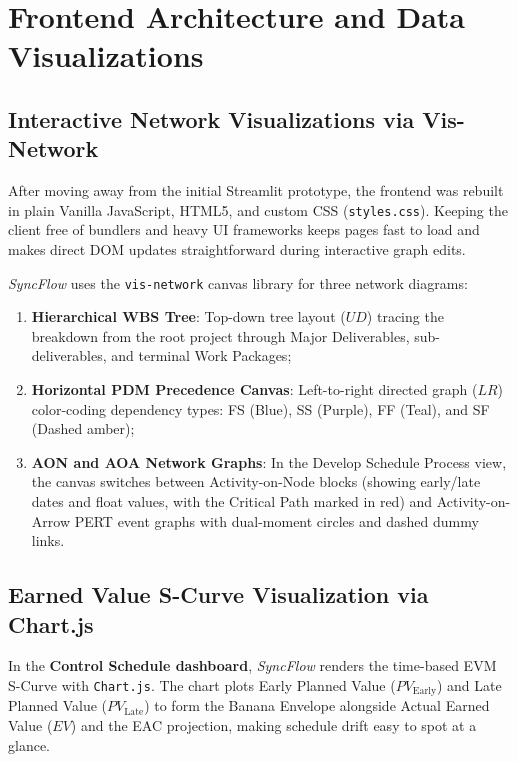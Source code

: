 \newpage

\section{Frontend Architecture and Data Visualizations}
\subsection{Interactive Network Visualizations via Vis-Network}
After moving away from the initial Streamlit prototype, the frontend was rebuilt in plain Vanilla JavaScript, HTML5, and custom CSS (\texttt{styles.css}). Keeping the client free of bundlers and heavy UI frameworks keeps pages fast to load and makes direct DOM updates straightforward during interactive graph edits.

\vspace{2mm}

\noindent \textit{SyncFlow} uses the \texttt{vis-network} canvas library for three network diagrams:
\begin{enumerate}[leftmargin=*,itemsep=1pt,topsep=1pt]
    \item \textbf{Hierarchical WBS Tree}: Top-down tree layout ($UD$) tracing the breakdown from the root project through Major Deliverables, sub-deliverables, and terminal Work Packages;
    
    \vspace{1mm}
    
    \item \textbf{Horizontal PDM Precedence Canvas}: Left-to-right directed graph ($LR$) color-coding dependency types: FS (Blue), SS (Purple), FF (Teal), and SF (Dashed amber);
    
    \vspace{1mm}
    
    \item \textbf{AON and AOA Network Graphs}: In the Develop Schedule Process view, the canvas switches between Activity-on-Node blocks (showing early/late dates and float values, with the Critical Path marked in red) and Activity-on-Arrow PERT event graphs with dual-moment circles and dashed dummy links.
\end{enumerate}

\vspace{4mm}

\subsection{Earned Value S-Curve Visualization via Chart.js}
In the \textbf{Control Schedule dashboard}, \textit{SyncFlow} renders the time-based EVM S-Curve with \texttt{Chart.js}. The chart plots Early Planned Value ($PV_{\text{Early}}$) and Late Planned Value ($PV_{\text{Late}}$) to form the Banana Envelope alongside Actual Earned Value ($EV$) and the EAC projection, making schedule drift easy to spot at a glance.


